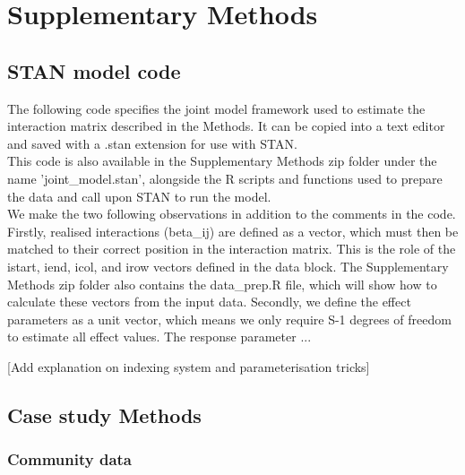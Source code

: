 \documentclass[a4,12pt]{article}
\begin{document}
% 
% 

\newpage

\printbibliography   

\newpage 

\section{Supplementary Methods}
\label{SI:Methods}

    \subsection{STAN model code}
    \label{SI:modelcode}
    The following code specifies the joint model framework used to estimate the interaction matrix described in the Methods. It can be copied into a text editor and saved with a .stan extension for use with STAN. \\

    This code is also available in the Supplementary Methods zip folder under the name 'joint\_model.stan', alongside the R scripts and functions used to prepare the data and call upon STAN to run the model. \\

    We make the two following observations in addition to the comments in the code. Firstly, realised interactions (beta\_ij) are defined as a vector, which must then be matched to their correct position in the interaction matrix. This is the role of the istart, iend, icol, and irow vectors defined in the data block. The Supplementary Methods zip folder also contains the data\_prep.R file, which will show how to calculate these vectors from the input data. 
    Secondly, we define the effect parameters as a unit vector, which means we only require S-1 degrees of freedom to estimate all effect values. The response parameter ...

    [Add explanation on indexing system and parameterisation tricks]




    



    \subsection{Case study Methods}
    \label{SI:casestudy}

        \subsubsection{Community data}
\end{document}
